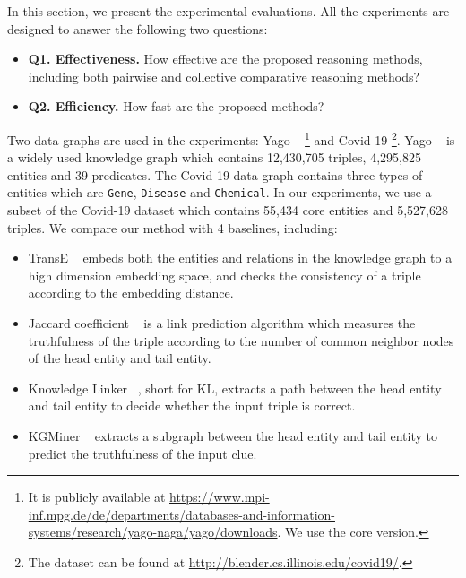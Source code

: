 


In this section, we present the experimental evaluations. All the experiments are designed to answer the following two questions:

\begin{itemize}
	\item {\bf Q1. Effectiveness.} How effective are the proposed reasoning methods, including both pairwise and collective comparative reasoning methods?
	\item {\bf Q2. Efficiency.} How fast are the proposed methods? %
\end{itemize}


Two data graphs are used in the experiments: Yago ~\cite{yago} \footnote{It is publicly available at \url{https://www.mpi-inf.mpg.de/de/departments/databases-and-information-systems/research/yago-naga/yago/downloads}. We use the core version.} and Covid-19 \footnote{The dataset can be found at \url{http://blender.cs.illinois.edu/covid19/}. }.
Yago ~\cite{yago} is a widely used knowledge graph which contains 12,430,705 triples, 4,295,825 entities and 39 predicates.
The Covid-19 data graph contains three types of entities which are {\tt Gene}, {\tt Disease} and {\tt Chemical}.
In our experiments, we use a subset of the Covid-19 dataset which contains 55,434 core entities and 5,527,628 triples.
We compare our method with 4 baselines, including:

\begin{itemize}
    \item TransE ~\cite{transE} embeds both the entities and relations in the knowledge graph to a high dimension embedding space, and checks the consistency of a triple according to the embedding distance.
    \item Jaccard coefficient ~\cite{jaccard} is a link prediction algorithm which measures the truthfulness of the triple according to the number of common neighbor nodes of the head entity and tail entity.
    \item Knowledge Linker ~\cite{KL}, short for KL, extracts a path between the head entity and tail entity to decide whether the input triple is correct.
    \item KGMiner ~\cite{kgminer} extracts a subgraph between the head entity and tail entity to predict the truthfulness of the input clue.
\end{itemize}

